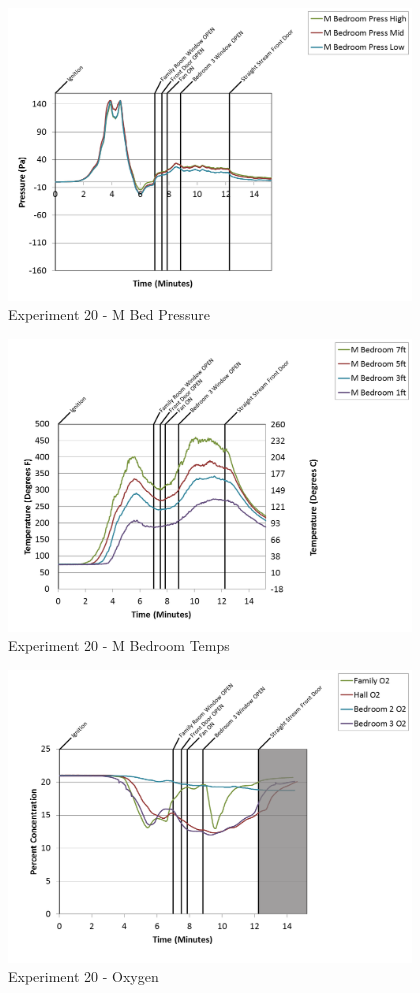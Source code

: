 \documentclass{article}
\begin{document}
\begin{appendices}
\clearpage

\begin{figure}[h!]
	\centering
	\includegraphics[height=3.05in]{0_Images/Results_Charts/Exp_20_Charts/MBedPressure.png}
	\caption{Experiment 20 - M Bed Pressure}
\end{figure}


\begin{figure}[h!]
	\centering
	\includegraphics[height=3.05in]{0_Images/Results_Charts/Exp_20_Charts/MBedroomTemps.png}
	\caption{Experiment 20 - M Bedroom Temps}
\end{figure}

\clearpage

\begin{figure}[h!]
	\centering
	\includegraphics[height=3.05in]{0_Images/Results_Charts/Exp_20_Charts/Oxygen.png}
	\caption{Experiment 20 - Oxygen}
\end{figure}



\end{appendices}
\end{document}
